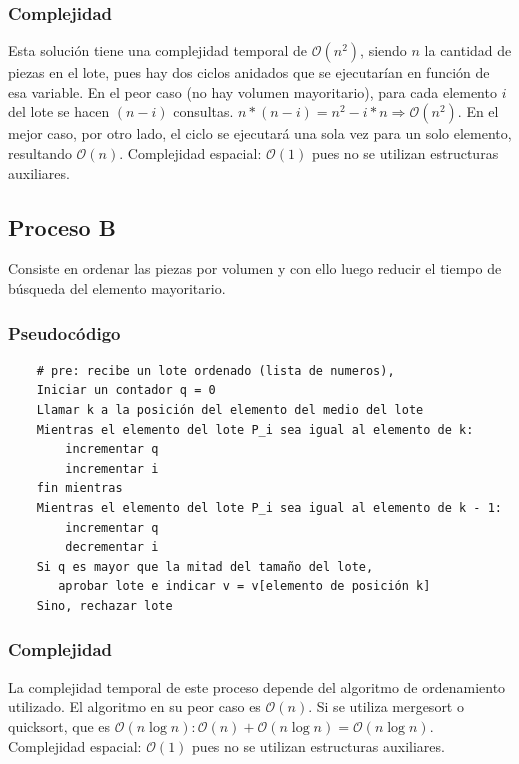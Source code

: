 \subsubsection{Complejidad}
	Esta solución tiene una complejidad temporal de $\mathcal{O}(n^2)$, siendo $n$ la cantidad de piezas en el lote, pues hay dos ciclos anidados que se ejecutarían en función de esa variable. En el peor caso (no hay volumen mayoritario), para cada elemento $i$ del lote se hacen $(n-i)$ consultas. $n*(n-i) = n^2-i*n \Rightarrow \mathcal{O}(n^2)$. En el mejor caso, por otro lado, el ciclo se ejecutará una sola vez para un solo elemento, resultando  $\mathcal{O}(n)$.
Complejidad espacial: $\mathcal{O}(1)$ pues no se utilizan estructuras auxiliares.


\subsection{Proceso B}
Consiste en ordenar las piezas por volumen y con ello luego reducir el tiempo de búsqueda del elemento mayoritario.
\subsubsection{Pseudocódigo}
\begin{verbatim}
    # pre: recibe un lote ordenado (lista de numeros), 
    Iniciar un contador q = 0
    Llamar k a la posición del elemento del medio del lote
    Mientras el elemento del lote P_i sea igual al elemento de k:
        incrementar q
        incrementar i
    fin mientras
    Mientras el elemento del lote P_i sea igual al elemento de k - 1:
        incrementar q
        decrementar i
    Si q es mayor que la mitad del tamaño del lote, 
       aprobar lote e indicar v = v[elemento de posición k]
    Sino, rechazar lote
\end{verbatim}
\subsubsection{Complejidad}
La complejidad temporal de este proceso depende del algoritmo de ordenamiento utilizado. El algoritmo en su peor caso es $\mathcal{O}(n)$. Si se utiliza mergesort o quicksort, que es $\mathcal{O}(n \log{}n): \mathcal{O}(n) + \mathcal{O}(n\log{}n) = \mathcal{O}(n \log{}n)$.
Complejidad espacial: $\mathcal{O}(1)$ pues no se utilizan estructuras auxiliares.

